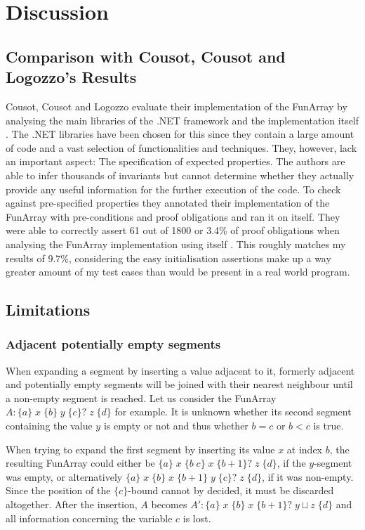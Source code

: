 \documentclass{report}
\newcommand{\funArray}[1]{$#1$}
\newcommand{\bound}[1]{\{#1\}}
\newcommand{\fvalue}[1]{\;#1\;}
\begin{document}
\section{Discussion}
\subsection{Comparison with Cousot, Cousot and Logozzo's Results}

Cousot, Cousot and Logozzo evaluate their implementation of the FunArray by analysing the main libraries of the .NET framework and the implementation itself \cite{cousot2011}. The .NET libraries have been chosen for this since they contain a large amount of code and a vast selection of functionalities and techniques. They, however, lack an important aspect: The specification of expected properties. The authors are able to infer thousands of invariants but cannot determine whether they actually provide any useful information for the further execution of the code. To check against pre-specified properties they annotated their implementation of the FunArray with pre-conditions and proof obligations and ran it on itself. They were able to correctly assert 61 out of 1800 or 3.4\% of proof obligations when analysing the FunArray implementation using itself \cite{cousot2011}. This roughly matches my results of 9.7\%, considering the easy initialisation assertions make up a way greater amount of my test cases than would be present in a real world program.

\subsection{Limitations}

\subsubsection{Adjacent potentially empty segments}
When expanding a segment by inserting a value adjacent to it, formerly adjacent and potentially empty segments will be joined with their nearest neighbour until a non-empty segment is reached. Let us consider the FunArray \funArray{A:\bound{a} \fvalue{x} \bound{b} \fvalue{y} \bound{c}? \fvalue{z} \bound{d}} for example. It is unknown whether its second segment containing the value $y$ is empty or not and thus whether $b=c$ or $b<c$ is true.

When trying to expand the first segment by inserting its value $x$ at index $b$, the resulting FunArray could either be \funArray{\bound{a} \fvalue{x} \bound{b\;c} \fvalue{x} \bound{b+1}? \fvalue{z} \bound{d}}, if the $y$-segment was empty, or alternatively \funArray{\bound{a} \fvalue{x} \bound{b} \fvalue{x} \bound{b+1} \fvalue{y} \bound{c}? \fvalue{z} \bound{d}}, if it was non-empty. Since the position of the \funArray{\bound{c}}-bound cannot by decided, it must be discarded altogether. After the insertion, $A$ becomes \funArray{A':\bound{a} \fvalue{x} \bound{b} \fvalue{x} \bound{b+1}? \fvalue{y\sqcup z} \bound{d}} and all information concerning the variable $c$ is lost.
\end{document}
